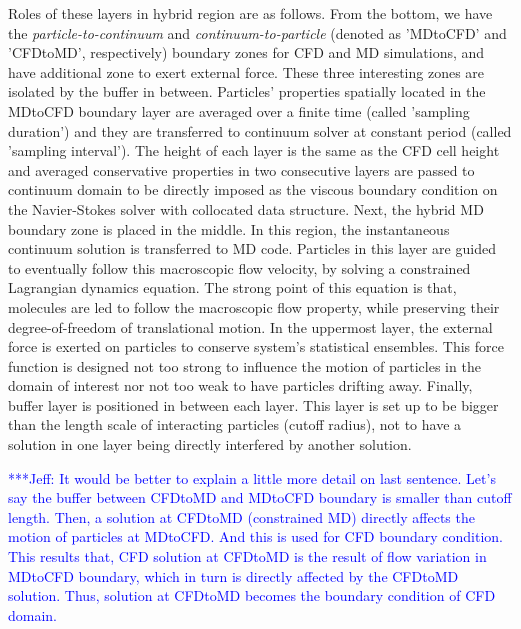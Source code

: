 \documentclass[preprint,12pt]{elsarticle}
\newcommand{\skonote}[1]{ {\textcolor{blue} { ***Jeff: #1 }}}
\newcommand{\skonote}[1]{}
\begin{document}
Roles of these layers in hybrid region are as follows.
From the bottom, we have the {\it{particle-to-continuum}} and {\it{continuum-to-particle}} (denoted as 'MDtoCFD' and 'CFDtoMD', respectively) boundary zones for CFD and MD simulations, and have additional zone to exert external force. These three interesting zones are isolated by the buffer in between.
Particles' properties spatially located in the MDtoCFD boundary layer are averaged over a finite time (called 'sampling duration') and they are transferred to continuum solver at constant period (called 'sampling interval'). The height of each layer is the same as the CFD cell height and averaged conservative properties in two consecutive layers are passed to continuum domain to be directly imposed as the viscous boundary condition on the Navier-Stokes solver with collocated data structure.
Next, the hybrid MD boundary zone is placed in the middle. In this region, the instantaneous continuum solution is transferred to MD code. Particles in this layer are guided to eventually follow this macroscopic flow velocity, by solving a constrained Lagrangian dynamics equation. The strong point of this equation is that, molecules are led to follow the macroscopic flow property, while preserving their degree-of-freedom of translational motion.
In the uppermost layer, the external force is exerted on particles to conserve system's statistical ensembles. This force function is designed not too strong to influence the motion of particles in the domain of interest nor not too weak to have particles drifting away. %
Finally, buffer layer is positioned in between each layer. This layer is set up to be bigger than the length scale of interacting particles (cutoff radius), not to have a solution in one layer being directly interfered by another solution.


\skonote{It would be better to explain a little more detail on last sentence. Let's say the buffer between CFDtoMD and MDtoCFD boundary is smaller than cutoff length. Then, a solution at CFDtoMD (constrained MD) directly affects the motion of particles at MDtoCFD. And this is used for CFD boundary condition. This results that, CFD solution at CFDtoMD is the result of flow variation in MDtoCFD boundary, which in turn is directly affected by the CFDtoMD solution. Thus, solution at CFDtoMD becomes the boundary condition of CFD domain.}
\end{document}
